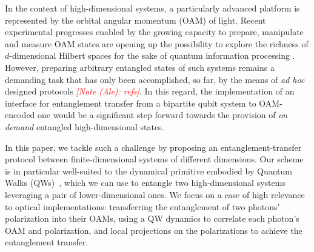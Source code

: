 \documentclass[
	aps, pra,
	superscriptaddress, twocolumn,
	floatfix,
	10pt
]{revtex4-1}
\newcommand{\parTitle}[1]{\noindent{\color{Mahogany}(\emph{#1})}}
\newcommand{\commale}[1]{{\textcolor{red} {\it{[Note (Ale): #1]}}}}
\renewcommand{\parTitle}[1]{}
\begin{document}
\parTitle{Recent experimental advances in HD entanglement with OAM} In the context of high-dimensional systems, a particularly advanced platform is represented by the orbital angular momentum (OAM) of light. Recent experimental progresses enabled by the growing capacity to prepare, manipulate and measure OAM states are opening up the possibility to explore the richness of $d$-dimensional Hilbert spaces for the sake of quantum information processing \cite{erhard2018twisted}. However, preparing arbitrary entangled states of such systems remains a demanding task that has only been accomplished, so far, by the means of {\it ad hoc} designed protocols \commale{refs}. In this regard, the implementation of an interface for entanglement transfer from a bipartite qubit system to OAM-encoded one would be a significant step forward towards the provision of {\it on demand} entangled high-dimensional states. 

\parTitle{In this paper we...}
In this paper, we tackle such a challenge by proposing an entanglement-transfer protocol between finite-dimensional systems of different dimensions.
Our scheme is in particular well-suited to the dynamical primitive embodied by Quantum Walks (QWs)~\cite{aharonov1993quantum,nayak2000quantum,ambainis2001onedimensional,Kempe2003quantum,venegas-andraca2012quantum}, which we can use to entangle two high-dimensional systems leveraging a pair of lower-dimensional ones.
We focus on a case of high relevance to optical implementations: transferring the entanglement of two photons' polarization into their OAMs, using a QW dynamics to correlate each photon's OAM and polarization, and local projections on the polarizations to achieve the entanglement transfer.
\end{document}

